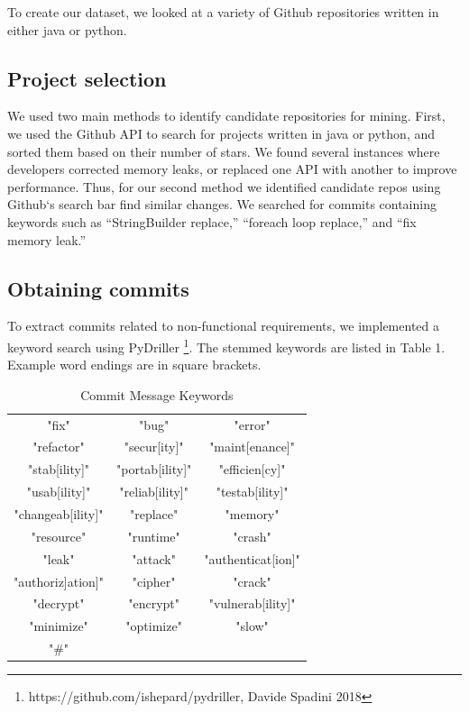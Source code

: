 \documentclass[sigconf]{acmart}
\begin{document}
To create our dataset, we looked at a variety of Github repositories written in either java or python. 


\subsection {Project selection}
We used two main methods to identify candidate repositories for mining. 
First, we used the Github API to search for projects written in java or python, and sorted them based on their number of stars. We found several instances where developers corrected memory leaks, or replaced one API with another to improve performance. Thus, for our second method we identified candidate repos using Github`s search bar find similar changes. We searched for commits containing keywords such as ``StringBuilder replace,'' ``foreach loop replace,'' and ``fix memory leak.''


\subsection{Obtaining commits}
To extract commits related to non-functional requirements, we implemented a keyword search using PyDriller \footnote{https://github.com/ishepard/pydriller, Davide Spadini 2018}. The stemmed keywords are listed in Table 1. Example word endings are in square brackets.

\begin{table}

  \caption{Commit Message Keywords}
  \label{tab:kwds}
\begin{tabular}{  c c c }
\toprule
 "fix"&"bug"&"error"\\
 "refactor"&"secur[ity]" &"maint[enance]"\\
 "stab[ility]"&"portab[ility]"&"efficien[cy]"\\
 "usab[ility]" & "reliab[ility]"&"testab[ility]"\\
 "changeab[ility]"& "replace"&"memory"\\
 "resource"& "runtime"&"crash"\\
 "leak" &"attack" &"authenticat[ion]"\\
 "authoriz]ation]"& "cipher"&"crack" \\ 
 "decrypt"&"encrypt"&"vulnerab[ility]"\\ 
 "minimize"&"optimize"&"slow"\\
 "\#"& &\\
\bottomrule
\end{tabular}
\end{table}
\end{document}
